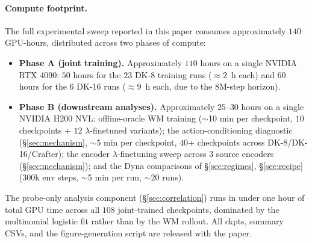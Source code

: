 \documentclass{article}
\begin{document}
\paragraph{Compute footprint.}
The full experimental sweep reported in this paper consumes approximately $140$ GPU-hours, distributed across two phases of compute:
\begin{itemize}
  \item \textbf{Phase A (joint training).} Approximately $110$ hours on a single NVIDIA RTX 4090: $50$ hours for the $23$ DK-8 training runs ($\approx 2$~h each) and $60$ hours for the $6$ DK-16 runs ($\approx 9$~h each, due to the 8M-step horizon).
  \item \textbf{Phase B (downstream analyses).} Approximately $25$--$30$ hours on a single NVIDIA H200 NVL: offline-oracle WM training ($\sim$10 min per checkpoint, $10$ checkpoints + $12$ $\lambda$-finetuned variants); the action-conditioning diagnostic (\S\ref{sec:mechanism}, $\sim$5 min per checkpoint, $40$+ checkpoints across DK-8/DK-16/Crafter); the encoder $\lambda$-finetuning sweep across $3$ source encoders (\S\ref{sec:mechanism}); and the Dyna comparisons of \S\ref{sec:regimes}, \S\ref{sec:recipe} ($300$k env steps, $\sim$5 min per run, $\sim 20$ runs).
\end{itemize}
The probe-only analysis component (\S\ref{sec:correlation}) runs in under one hour of total GPU time across all $108$ joint-trained checkpoints, dominated by the multinomial logistic fit rather than by the WM rollout. All ckpts, summary CSVs, and the figure-generation script are released with the paper.


\end{document}
